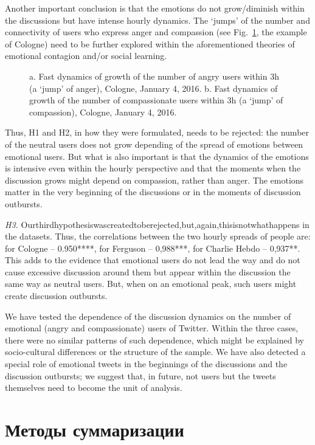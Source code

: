 Another important conclusion is that the emotions do not grow/diminish within the discussions but have intense hourly dynamics. The ‘jumps’ of the number and connectivity of users who express anger and compassion (see Fig.~\cref{fig:fastDynamcs}, the example of Cologne) need to be further explored within the aforementioned theories of emotional contagion and/or social learning.

\begin{figure}[ht]
	\caption{a. Fast dynamics of growth of the number of angry users within 3h (a ‘jump’ of anger), Cologne, January 4, 2016. b. Fast dynamics of growth of the number of compassionate users within 3h (a ‘jump’ of compassion), Cologne, January 4, 2016.}\label{fig:fastDynamcs}
\end{figure} 

Thus, H1 and H2, in how they were formulated, needs to be rejected: the number of the neutral users does not grow depending of the spread of emotions between emotional users. But what is also important is that the dynamics of the emotions is intensive even within the hourly perspective and that the moments when the discussion grows might depend on compassion, rather than anger. The emotions matter in the very beginning of the discussions or in the moments of discussion outbursts.

\textit{H3.} Ourthirdhypothesiswascreatedtoberejected,but,again,thisisnotwhathappens in the datasets. Thus, the correlations between the two hourly spreads of people are: for Cologne -- 0.950****, for Ferguson -- 0,988***, for Charlie Hebdo -- 0,937**. This adds to the evidence that emotional users do not lead the way and do not cause excessive discussion around them but appear within the discussion the same way as neutral users. But, when on an emotional peak, such users might create discussion outbursts.

We have tested the dependence of the discussion dynamics on the number of emotional (angry and compassionate) users of Twitter. Within the three cases, there were no similar patterns of such dependence, which might be explained by socio-cultural differences or the structure of the sample. We have also detected a special role of emotional tweets in the beginnings of the discussions and the discussion outbursts; we suggest that, in future, not users but the tweets themselves need to become the unit of analysis.

\section{Методы суммаризации}\label{sec:ch5/sect4}

